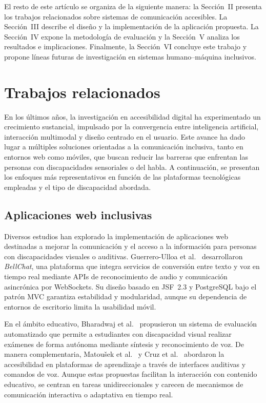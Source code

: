 \documentclass[lettersize,journal]{IEEEtran}
\begin{document}
        El resto de este artículo se organiza de la siguiente manera: la Sección~II presenta los trabajos relacionados sobre sistemas de comunicación accesibles. La Sección~III describe el diseño y la implementación de la aplicación propuesta. La Sección~IV expone la metodología de evaluación y la Sección~V analiza los resultados e implicaciones. Finalmente, la Sección~VI concluye este trabajo y propone líneas futuras de investigación en sistemas humano–máquina inclusivos.
        
    \section{Trabajos relacionados}
        En los últimos años, la investigación en accesibilidad digital ha experimentado un crecimiento sustancial, impulsado por la convergencia entre inteligencia artificial, interacción multimodal y diseño centrado en el usuario. Este avance ha dado lugar a múltiples soluciones orientadas a la comunicación inclusiva, tanto en entornos web como móviles, que buscan reducir las barreras que enfrentan las personas con discapacidades sensoriales o del habla. A continuación, se presentan los enfoques más representativos en función de las plataformas tecnológicas empleadas y el tipo de discapacidad abordada.
        
        \subsection{Aplicaciones web inclusivas}
            Diversos estudios han explorado la implementación de aplicaciones web destinadas a mejorar la comunicación y el acceso a la información para personas con discapacidades visuales o auditivas. Guerrero-Ulloa et al.~\cite{GuerreroUlloa2024} desarrollaron \textit{BellChat}, una plataforma que integra servicios de conversión entre texto y voz en tiempo real mediante APIs de reconocimiento de audio y comunicación asincrónica por WebSockets. Su diseño basado en JSF~2.3 y PostgreSQL bajo el patrón MVC garantiza estabilidad y modularidad, aunque su dependencia de entornos de escritorio limita la usabilidad móvil.  
            
            En el ámbito educativo, Bharadwaj et al.~\cite{Bharadwaj2020} propusieron un sistema de evaluación automatizado que permite a estudiantes con discapacidad visual realizar exámenes de forma autónoma mediante síntesis y reconocimiento de voz. De manera complementaria, Matoušek et al.~\cite{Matousek2020} y Cruz et al.~\cite{Cruz2020} abordaron la accesibilidad en plataformas de aprendizaje a través de interfaces auditivas y comandos de voz. Aunque estas propuestas facilitan la interacción con contenido educativo, se centran en tareas unidireccionales y carecen de mecanismos de comunicación interactiva o adaptativa en tiempo real.
            
\end{document}
